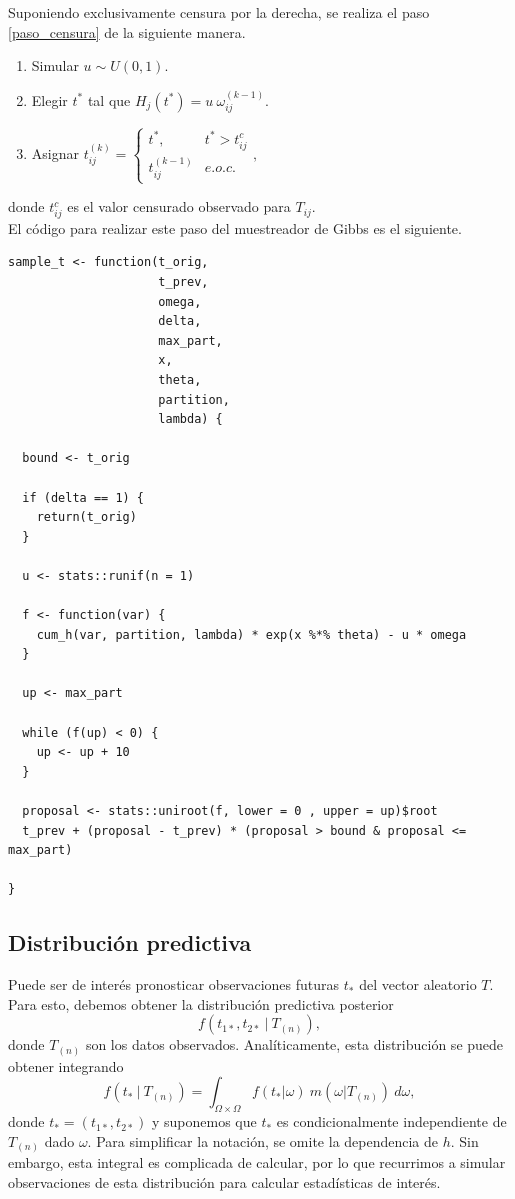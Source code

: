 \documentclass[11pt,a4paper]{article}
\begin{document}
Suponiendo exclusivamente censura por la derecha, se realiza el paso \eqref{paso_censura} de la siguiente manera.
\begin{enumerate}
\item Simular $u\sim U(0,1)$.
\item Elegir $t^*$ tal que $H_j(t^*) = u \ \omega_{ij}^{(k-1)}.$
\item Asignar $t_{ij}^{(k)} = 
\begin{cases}
t^*, & t^* > t_{ij}^c\\
t_{ij}^{(k-1)} & e.o.c.
\end{cases},$
\end{enumerate}
donde $t_{ij}^c$ es el valor censurado observado para $T_{ij}$.\\

El código para realizar este paso del muestreador de Gibbs es el siguiente.\\

\begin{lstlisting}
sample_t <- function(t_orig,
                     t_prev,
                     omega,
                     delta,
                     max_part,
                     x,
                     theta,
                     partition,
                     lambda) {

  bound <- t_orig

  if (delta == 1) {
    return(t_orig)
  }

  u <- stats::runif(n = 1)

  f <- function(var) {
    cum_h(var, partition, lambda) * exp(x %*% theta) - u * omega
  }

  up <- max_part

  while (f(up) < 0) {
    up <- up + 10
  }

  proposal <- stats::uniroot(f, lower = 0 , upper = up)$root
  t_prev + (proposal - t_prev) * (proposal > bound & proposal <= max_part)

}
\end{lstlisting}

\subsection{Distribución predictiva}
Puede ser de interés pronosticar observaciones futuras $t_*$ del vector aleatorio $T$. Para esto, debemos obtener la distribución predictiva posterior $$f(t_{1*}, t_{2*} \ | \ T_{(n)}),$$ donde $T_{(n)}$ son los datos observados. Analíticamente, esta distribución se puede obtener integrando $$f(t_* \ | \ T_{(n)}) = \int_{\Omega \times \Omega} f(t_* | \omega) \ m(\omega | T_{(n)}) \ d\omega,$$ donde $t_*=(t_{1*}, t_{2*})$ y suponemos que $t_*$ es condicionalmente independiente de $T_{(n)}$ dado $\omega$. Para simplificar la notación, se omite la dependencia de $h$. Sin embargo, esta integral es complicada de calcular, por lo que recurrimos a simular observaciones de esta distribución para calcular estadísticas de interés.\\
\end{document}
